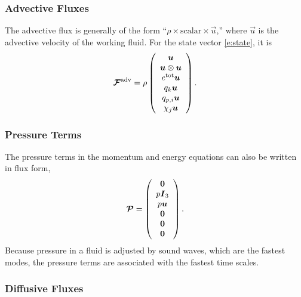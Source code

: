 \documentclass{report}
\begin{document}
{\subsubsection{Advective Fluxes}

The advective flux is generally of the form ``$\rho \times \mathrm{scalar} \times \vec{u}$,'' where $\vec{u}$ is the advective velocity of the working fluid. For the state vector \eqref{e:state}, it is 
 \begin{equation}
 \label{e:adv_flux}
 \boldsymbol{{\mathcal{F}}}^{\mathrm{adv}}=\rho \left( \begin{array}{c}
 \boldsymbol{{u}} \\
 \boldsymbol{{u}} \otimes \boldsymbol{{u}} \\
 e^{\mathrm{tot}} \boldsymbol{{u}}\\
q_k \boldsymbol{{u}}\\
q_{p,i} \boldsymbol{{u}} \\
\chi_j \boldsymbol{{u}}
\end{array}
\right).
 \end{equation}

\subsubsection{Pressure Terms}

The pressure terms in the momentum and energy equations can also be written in flux form,
\begin{equation}
\boldsymbol{{\mathcal{P}}} = \left( \begin{array}{c}
\boldsymbol{{0}} \\
p \boldsymbol{{I}}_3 \\
p \boldsymbol{{u}} \\
\boldsymbol{{0}} \\
\boldsymbol{{0}} \\
\boldsymbol{{0}} 
\end{array}
\right).
\end{equation}
Because pressure in a fluid is adjusted by sound waves, which are the fastest modes, the pressure terms are associated with the fastest time scales. 

\subsubsection{Diffusive Fluxes}

}
\end{document}
